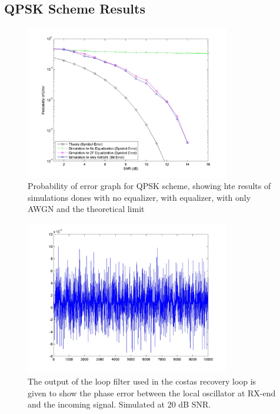 \documentclass[]{article}
\begin{document}
\subsection{QPSK Scheme Results}

\begin{figure}[H]
\centering
\includegraphics[width=0.8\textwidth]{qpSNR.jpg}
\caption{Probability of error graph for QPSK scheme, showing hte results of simulations dones with no equalizer, with equalizer, with only AWGN and the theoretical limit \label{fig:qpBER}}
\end{figure}

\begin{figure}[H]
\centering
\includegraphics[width=0.8\textwidth]{loop_filter_qpsk20.jpg}
\caption{The output of the loop filter used in the costas recovery loop is given to show the phase error between the local oscillator at RX-end and the incoming signal. Simulated at 20 dB SNR. \label{fig:qpLoop}}
\end{figure}
\end{document}
